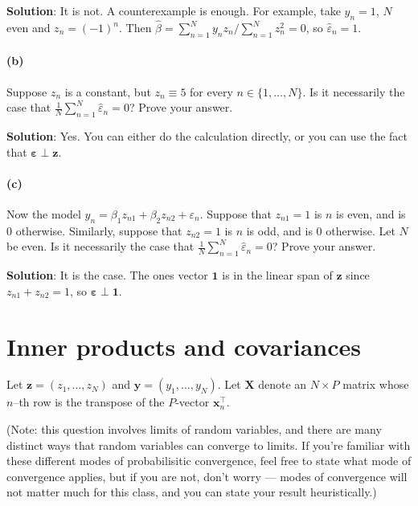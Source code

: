 \documentclass[
  letterpaper,
  DIV=11,
  numbers=noendperiod]{scrartcl}
\let\oldparagraph\paragraph
\renewcommand{\paragraph}[1]{\oldparagraph{#1}\mbox{}}
\begin{document}
\textbf{Solution}: It is not. A counterexample is enough. For example,
take \(y_n = 1\), \(N\) even and \(z_n = (-1)^n\). Then
\(\hat{\beta}= \sum_{n=1}^Ny_n z_n / \sum_{n=1}^Nz_n^2 = 0\), so
\(\hat{\varepsilon}_n = 1\).

\hypertarget{b-1}{%
\paragraph{(b)}\label{b-1}}

Suppose \(z_n\) is a constant, but \(z_n \equiv 5\) for every
\(n \in \{1, \ldots, N\}\). Is it necessarily the case that
\(\frac{1}{N} \sum_{n=1}^N\hat{\varepsilon}_n = 0\)? Prove your answer.

\textbf{Solution}: Yes. You can either do the calculation directly, or
you can use the fact that
\(\boldsymbol{\varepsilon}\perp \boldsymbol{z}\).

\hypertarget{c-1}{%
\paragraph{(c)}\label{c-1}}

Now the model \(y_n = \beta_1 z_{n1} + \beta_2 z_{n2} + \varepsilon_n\).
Suppose that \(z_{n1} = 1\) is \(n\) is even, and is \(0\) otherwise.
Similarly, suppose that \(z_{n2} = 1\) is \(n\) is odd, and is \(0\)
otherwise. Let \(N\) be even. Is it necessarily the case that
\(\frac{1}{N} \sum_{n=1}^N\hat{\varepsilon}_n = 0\)? Prove your answer.

\textbf{Solution}: It is the case. The ones vector \(\boldsymbol{1}\) is
in the linear span of \(\boldsymbol{z}\) since \(z_{n1} + z_{n2} = 1\),
so \(\boldsymbol{\varepsilon}\perp \boldsymbol{1}\).

\hypertarget{inner-products-and-covariances}{%
\section{Inner products and
covariances}\label{inner-products-and-covariances}}

Let \(\boldsymbol{z}= (z_1, \ldots, z_N)\) and
\(\boldsymbol{y}= (y_1, \ldots, y_N)\). Let \(\boldsymbol{X}\) denote an
\(N \times P\) matrix whose \(n\)--th row is the transpose of the
\(P\)-vector \(\boldsymbol{x}_n^\intercal\).

(Note: this question involves limits of random variables, and there are
many distinct ways that random variables can converge to limits. If
you're familiar with these different modes of probabilisitic
convergence, feel free to state what mode of convergence applies, but if
you are not, don't worry --- modes of convergence will not matter much
for this class, and you can state your result heuristically.)
\end{document}
